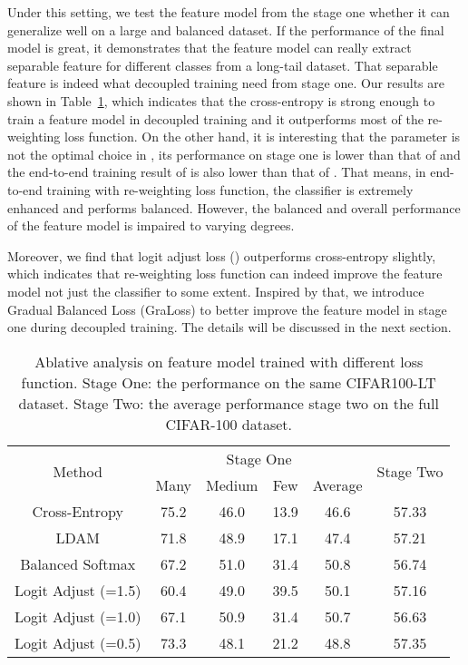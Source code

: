 \documentclass[runningheads]{llncs}
\begin{document}
Under this setting, we test the feature model from the stage one whether it can generalize well on a large and balanced dataset. If the performance of the final model is great, it demonstrates that the feature model can really extract separable feature for different classes from a long-tail dataset. That separable feature is indeed what decoupled training need from stage one. Our results are shown in Table~\ref{table:Ablative Analysis}, which indicates that the cross-entropy is strong enough to train a feature model in decoupled training and it outperforms most of the re-weighting loss function. On the other hand, it is interesting that the parameter  is not the optimal choice in \cite{menon2020long}, its performance on stage one is lower than that of  and the end-to-end training result of  is also lower than that of . That means, in end-to-end training with re-weighting loss function, the classifier is extremely enhanced and performs balanced. However, the balanced and overall performance of the feature model is impaired to varying degrees.

Moreover, we find that logit adjust loss \cite{menon2020long} () outperforms cross-entropy slightly, which indicates that re-weighting loss function can indeed improve the feature model not just the classifier to some extent. Inspired by that, we introduce Gradual Balanced Loss (GraLoss) to better improve the feature model in stage one during decoupled training. The details will be discussed in the next section.

\setlength{\tabcolsep}{4pt}
\begin{table}
\begin{center}
\caption{Ablative analysis on feature model trained with different loss function. Stage One: the performance on the same CIFAR100-LT dataset. Stage Two: the average performance stage two on the full CIFAR-100 dataset. }
\label{table:Ablative Analysis}
\begin{tabular}{cccccc}
\toprule
    \multirow{2}{*}{Method}&  
	\multicolumn{4}{c}{Stage One}& \multirow{2}{*}{Stage Two} \\
	\cmidrule(lr){2-5}  
	& Many & Medium & Few & Average & \\
	\hline
    Cross-Entropy  & 75.2 & 46.0 & 13.9 & 46.6 & {57.33}\\
    LDAM \cite{cao2019learning} & 71.8 & 48.9 & 17.1 & 47.4 & 57.21\\
    Balanced Softmax \cite{ren2020balanced}  & 67.2 & 51.0 & 31.4 & 50.8 & 56.74\\
    Logit Adjust \cite{menon2020long} (=1.5) & 60.4 & 49.0 & 39.5 & 50.1 & 57.16\\
    Logit Adjust \cite{menon2020long} (=1.0) & 67.1 & 50.9 & 31.4 & 50.7 & 56.63\\
    Logit Adjust \cite{menon2020long} (=0.5) & 73.3 & 48.1 & 21.2 & 48.8 & 57.35\\
\bottomrule
\end{tabular}
\end{center}
\end{table}
\setlength{\tabcolsep}{1.4pt}
\end{document}
